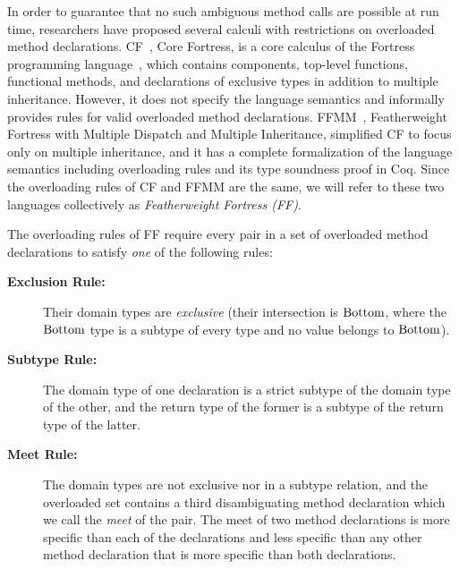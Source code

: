In order to guarantee that no such ambiguous method calls are possible
at run time, researchers have proposed several calculi with restrictions
on overloaded method declarations.  CF~\cite{ff}, Core Fortress, is a core
calculus of the Fortress programming language~\cite{fortress}, which contains
components, top-level functions, functional methods, and declarations
of exclusive types in addition to multiple inheritance.  However, it
does not specify the language semantics and informally provides rules
for valid overloaded method declarations.  FFMM~\cite{ffcoq},
Featherweight Fortress with Multiple Dispatch and Multiple Inheritance,
simplified CF to focus only on multiple inheritance, and it has a
complete formalization of the language semantics including overloading
rules and its type soundness proof in Coq.  Since the overloading rules
of CF and FFMM are the same, we will refer to these two languages collectively as
\textit{Featherweight Fortress (FF)}.

The overloading rules of FF require every pair in a set of overloaded
method declarations to satisfy \emph{one} of the following rules:
\begin{description}
\item[\textbf{Exclusion Rule:}] Their domain types are \textit{exclusive}
(their intersection is $\mathord{\mathrm{Bottom}}$, where the $\mathord{\mathrm{Bottom}}$ type is a subtype of every type and
no value belongs to $\mathord{\mathrm{Bottom}}$).

\item[\textbf{Subtype Rule:}] The domain type of one declaration is
a strict subtype of the domain type of the other, and the return type of
the former is a subtype of the return type of the latter.

\item[\textbf{Meet Rule:}] The domain types are not exclusive nor in a
subtype relation, and the overloaded set contains a third disambiguating
method declaration which we call the \textit{meet} of the pair.
The meet of two method declarations is more specific than each of the
declarations and less specific than any other method declaration that is
more specific than both declarations.
\end{description}

